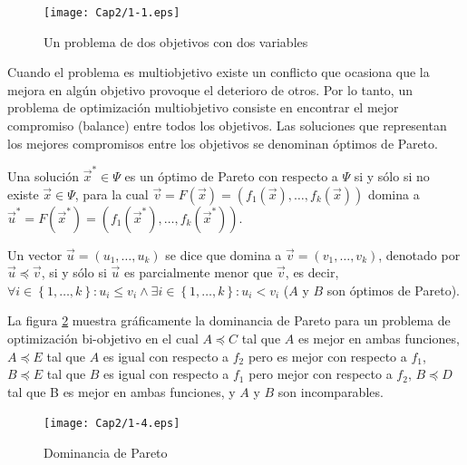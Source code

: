       \begin{figure}
	\centering
	\texttt{[image: Cap2/1-1.eps]}
	  \caption{Un problema de dos objetivos con dos variables}
      \label{fig:multiobj}
      \end{figure}
            
      Cuando el problema es multiobjetivo existe un conflicto que ocasiona que la mejora en alg\'un objetivo provoque 
      el deterioro de otros. Por lo tanto, un problema de optimizaci\'on multiobjetivo consiste en encontrar el mejor 
      compromiso (balance) entre todos los objetivos. Las soluciones que representan los mejores compromisos entre los 
      objetivos se denominan \'optimos de Pareto.  
      
      \begin{definicion}
	  Una soluci\'on $\vec{x}^*\in \Psi$ es un \'optimo de Pareto con respecto a $\Psi$ si y s\'olo si no existe 
	  $\vec{x}\in \Psi$, para la cual $\vec{v} = F\left(\vec{x}\right)=\left(f_1\left(\vec{x}\right), \ldots,f_k\left(\vec{x}\right) \right)$ 
	  domina a $\vec{u}^*=F\left(\vec{x}^*\right)=\left(f_1\left(\vec{x}^*\right), \ldots,f_k\left(\vec{x}^*\right) \right)$.
      \end{definicion}
      
      \begin{definicion}
	  Un vector $\vec{u} = \left(u_1, \ldots, u_k \right)$ se dice que domina a $\vec{v} = \left(v_1, \ldots, v_k \right)$,
	  denotado por $\vec{u} \preceq \vec{v}$, si y s\'olo si $\vec{u}$ es parcialmente menor que $\vec{v}$, es decir, 
	  $\forall i \in \left\{1, \ldots, k \right\}: u_i \leq v_i \wedge \exists i \in \left\{1, \ldots, k\right\}: u_i < v_i$
	  ($A$ y $B$ son \'optimos de Pareto).
      \end{definicion}
    
      La figura \ref{fig:paretodominance} muestra gr\'aficamente la dominancia de Pareto para un problema de optimizaci\'on
      bi-objetivo en el cual $A \preceq C$ tal que $A$ es mejor en ambas funciones, $A \preceq E$ tal que $A$ es igual con respecto 
      a $f_2$ pero es mejor con respecto a $f_1$, $B \preceq E$ tal que $B$  es igual con respecto a $f_1$ pero mejor con respecto a 
      $f_2$, $B\preceq D$ tal que B es mejor en ambas funciones, y $A$ y $B$ son incomparables.
       
       \begin{figure}
	\centering
	\texttt{[image: Cap2/1-4.eps]}
	  \caption{Dominancia de Pareto}
      \label{fig:paretodominance}
      \end{figure}
       
